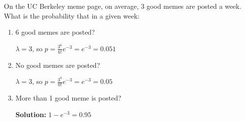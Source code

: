 \question On the UC Berkeley meme page, on average, 3 good memes are posted a week. What is the probability that in a given week: 
\begin{enumerate}[label=(\alph*)]
    \item 6 good memes are posted? 
    \begin{solution} [.5 cm]
    $\lambda = 3$, so $p = \frac{3^6}{6!}e^{-3} = e^{-3} = 0.051$ 
    \end{solution}
    \item No good memes are posted?
    \begin{solution} [.5 cm]
    $\lambda = 3$, so $p = \frac{3^0}{0!}e^{-3} = e^{-3} = 0.05$
    \end{solution} 
    \item More than 1 good meme is posted?
    \begin{solution} [.5 cm]
    \textbf{Solution:} $1-e^{-3} = 0.95$
    \end{solution} 
\end{enumerate}